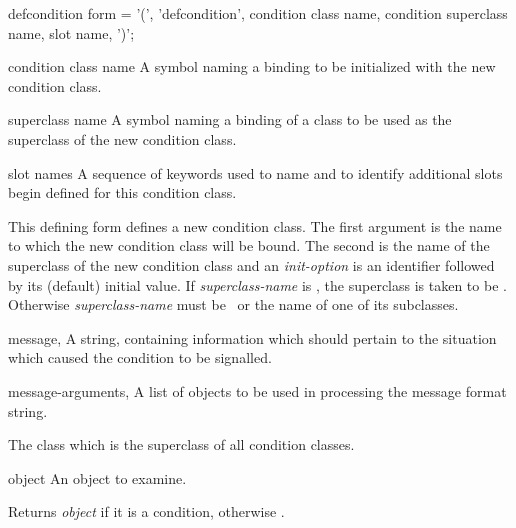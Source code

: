 \begin{optDefinition}
%
\label{defcondition}
%
\Syntax
\label{defcondition-syntax}
\savesyntax{}\vbox{\small\syntax
defcondition form
   = '(', 'defcondition',
     condition class name,
     condition superclass name,
     {slot name}, ')';
\endsyntax}
%
\begin{arguments}
    \item[condition class name] A symbol naming a binding to be initialized with
    the new condition class.
    \item[superclass name] A symbol naming a binding of a class to be used as
    the superclass of the new condition class.
    \item[slot names] A sequence of keywords used to name and to
    identify additional slots begin defined for this condition class.
\end{arguments}
%
\remarks%
This defining form defines a new condition class.  The first argument
is the name to which the new condition class will be bound.  The
second is the name of the superclass of the new condition class and an
{\em init-option\/} is an identifier followed by its (default) initial
value.  If {\em superclass-name\/} is \nil, the superclass is
taken to be
.  Otherwise {\em superclass-name\/} must be \
or the name of one of its subclasses.

%
\begin{initoptions}
%
    \item[message, \classref{string}] A string, containing information which should
    pertain to the situation which caused the condition to be signalled.
%
    \item[message-arguments, \classref{list}] A list of objects to be used in
    processing the message format string.
%
\end{initoptions}
%
\remarks%
The class which is the superclass of all condition classes.

%
\begin{arguments}
    \item[object] An object to examine.
\end{arguments}
%
\result%
Returns {\em object\/} if it is a condition, otherwise \nil.


\end{optDefinition}
